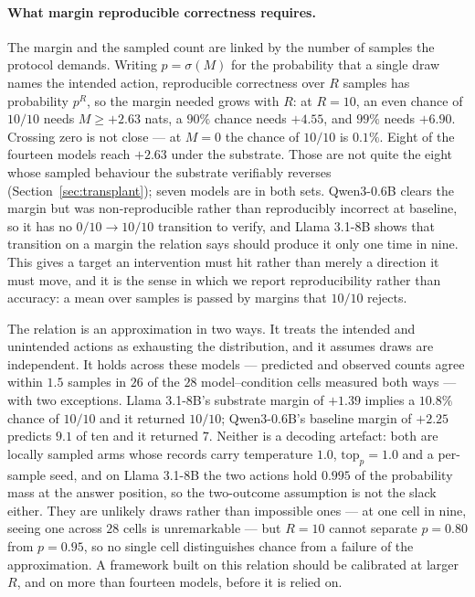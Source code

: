 \paragraph{What margin reproducible correctness requires.}
The margin and the sampled count are linked by the number of samples the
protocol demands. Writing $p = \sigma(M)$ for the probability that a single
draw names the intended action, reproducible correctness over $R$ samples has
probability $p^{R}$, so the margin needed grows with $R$: at $R=10$, an even
chance of $10/10$ needs $M \ge +2.63$ nats, a $90\%$ chance needs $+4.55$, and
$99\%$ needs $+6.90$. Crossing zero is not close --- at $M=0$ the chance of
$10/10$ is $0.1\%$. Eight of the fourteen models reach $+2.63$ under the substrate. Those are not
quite the eight whose sampled behaviour the substrate verifiably reverses
(Section~\ref{sec:transplant}); seven models are in both sets. Qwen3-0.6B clears
the margin but was non-reproducible rather than reproducibly incorrect at
baseline, so it has no $0/10 \to 10/10$ transition to verify, and Llama 3.1-8B
shows that transition on a margin the relation says should produce it only one
time in nine.
This gives a target an intervention must hit rather than merely a direction it
must move, and it is the sense in which we report reproducibility rather than
accuracy: a mean over samples is passed by margins that $10/10$ rejects.

The relation is an approximation in two ways. It treats the intended and
unintended actions as exhausting the distribution, and it assumes draws are
independent. It holds across these models --- predicted and observed counts
agree within $1.5$ samples in $26$ of the $28$ model--condition cells measured
both ways --- with two exceptions. Llama 3.1-8B's substrate margin of $+1.39$
implies a $10.8\%$ chance of $10/10$ and it returned $10/10$; Qwen3-0.6B's
baseline margin of $+2.25$ predicts $9.1$ of ten and it returned $7$. Neither is a decoding
artefact: both are locally sampled arms whose records carry temperature $1.0$,
$\mathrm{top}_p = 1.0$ and a per-sample seed, and on Llama 3.1-8B the two actions
hold $0.995$ of the probability mass at the answer position, so the two-outcome
assumption is not the slack either. They are unlikely draws rather than impossible
ones --- at one cell in nine, seeing one across $28$ cells is unremarkable --- but
$R=10$ cannot separate $p=0.80$ from $p=0.95$, so no single cell distinguishes
chance from a failure of the approximation. A framework built on this relation
should be calibrated at larger $R$, and on more than fourteen models, before it is
relied on.

